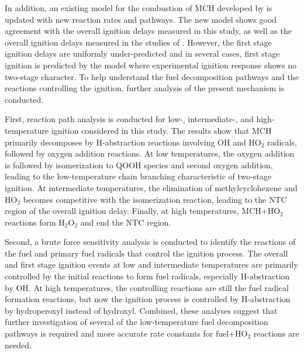 \documentclass[../main.tex]{subfiles}
\begin{document}
In addition, an existing model for the combustion of MCH developed by
\textcite{Pitz2007} is updated with new reaction rates and pathways.
The new model shows good agreement with the overall ignition delays
measured in this study, as well as the overall ignition delays measured
in the studies of \textcite{Mittal2009,Vasu2009,Vanderover2009}. However,
the first stage ignition delays are uniformly under-predicted and in
several cases, first stage ignition is predicted by the model where
experimental ignition response shows no two-stage character. To help
understand the fuel decomposition pathways and the reactions controlling
the ignition, further analysis of the present mechanism is conducted.

First, reaction path analysis is conducted for low-, intermediate-, and
high-temperature ignition considered in this study. The results show that
MCH primarily decomposes by H-abstraction reactions involving OH and HO$_2$
radicals, followed by oxygen addition reactions. At low temperatures,
the oxygen addition is followed by isomerization to QOOH species and
second oxygen addition, leading to the low-temperature chain branching
characteristic of two-stage ignition. At intermediate temperatures, the
elimination of methylcyclohexene and HO$_2$ becomes competitive with the
isomerization reaction, leading to the NTC region of the overall ignition
delay. Finally, at high temperatures, MCH+HO$_2$ reactions form H$_2$O$_2$ and end
the NTC region.

Second, a brute force sensitivity analysis is conducted to identify the
reactions of the fuel and primary fuel radicals that control the ignition
process. The overall and first stage ignition events at low and intermediate
temperatures are primarily controlled by the initial reactions to form
fuel radicals, especially H-abstraction by OH. At high temperatures, the
controlling reactions are still the fuel radical formation reactions, but
now the ignition process is controlled by H-abstraction by hydroperoxyl
instead of hydroxyl. Combined, these analyses suggest that further
investigation of several of the low-temperature fuel decomposition
pathways is required and more accurate rate constants for fuel+HO$_2$
reactions are needed.
\end{document}
